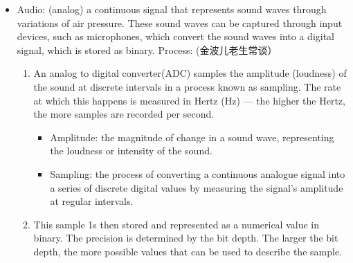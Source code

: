 \begin{itemize}
\begin{itemize}
\begin{itemize}
However, in reality, this calculation is not completely accurate, as the image would require 
more data to store metadata and other header information.
            \item Metadata: information that describes other data, providing context and details about the data's content, structure and attributes.
        \end{itemize}
		\item Ways to improve the image quality:
		\begin{itemize}
		    \item Increase image resolution. A higher resolution allows for greater detail and clarity. The trade-off for a higher resolution image is larger file size, which can impact storage and transfer efficiency. 依旧老生常谈
		    \item Increase color depth. When we increase the colour depth, it allows for a wider range of colours to be represented, resulting in more vibrant and accurate images. $2^\text{bit depth}=$ numbers of color available for representation. Mostly 24 bits for modern photos.
		\end{itemize}
	\item When working with graphics, RGB values are often shown in hexadecimal. 
    \end{itemize}
    \item Audio: (analog) a continuous signal that represents sound waves through variations of air pressure. These sound waves can be captured through input devices, such as microphones, which convert the sound waves into a digital signal, which is stored as binary. Process: (金波儿老生常谈）
    \begin{enumerate}
        \item An analog to digital converter(ADC) samples the amplitude (loudness) of the sound at discrete intervals in a process known as sampling. The rate at which this happens is measured in Hertz (Hz) — the higher the Hertz, the more samples are recorded per second.
        \begin{itemize}
            \item Amplitude: the magnitude of change in a sound wave, representing the loudness or intensity of the sound. 
            \item  Sampling: the process of converting a continuous analogue signal into a series of discrete digital values by measuring the signal’s amplitude at regular intervals. 
        \end{itemize}
		\item This sample 1s then stored and represented as a numerical value in binary. The precision is determined by the bit depth. The larger the bit depth, the more possible values that can be used to describe the sample.

\end{enumerate}
\end{itemize}
